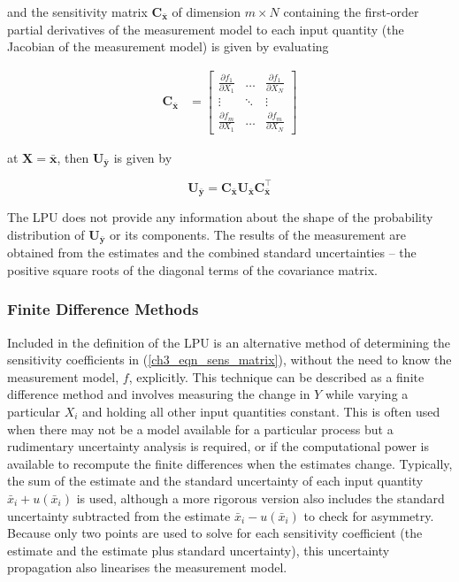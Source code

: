 \documentclass[../thesis/thesis.tex]{subfiles}
\begin{document}
and the sensitivity matrix $\boldsymbol C_{\bar{\boldsymbol x}}$ of dimension $m \times N$ containing the first-order partial derivatives of the measurement model to each input quantity (the Jacobian of the measurement model) is given by evaluating

\begin{align}
\boldsymbol C_{\bar{\boldsymbol x}} & = 
\begin{bmatrix}
\displaystyle \frac{\partial f_1}{\partial X_1}&\dots&\displaystyle \frac{\partial f_1}{\partial X_N}\\
\vdots&\ddots&\vdots\\
\displaystyle \frac{\partial f_m}{\partial X_1}&\dots&\displaystyle \frac{\partial f_m}{\partial X_N}
\end{bmatrix}
\label{ch3_eqn_sens_matrix}
\end{align}

at $\boldsymbol X = \bar{\boldsymbol x}$, then $\boldsymbol U_{\bar{\boldsymbol y}}$ is given by

\begin{equation}
\boldsymbol U_{\bar{\boldsymbol y}} = \boldsymbol C_{\bar{\boldsymbol x}}\boldsymbol U_{\bar{\boldsymbol x}}\boldsymbol C_{\bar{\boldsymbol x}}^\top
\end{equation}

The LPU does not provide any information about the shape of the probability distribution of $\boldsymbol U_{\bar{\boldsymbol y}}$ or its components. The results of the measurement are obtained from the estimates and the combined standard uncertainties – the positive square roots of the diagonal terms of the covariance matrix.

\subsubsection{Finite Difference Methods} \label{ch3_sec_fd_methods}

Included in the definition of the LPU is an alternative method of determining the sensitivity coefficients in (\ref{ch3_eqn_sens_matrix}), without the need to know the measurement model, $f$, explicitly. This technique can be described as a finite difference method and involves measuring the change in $Y$ while varying a particular $X_i$ and holding all other input quantities constant. This is often used when there may not be a model available for a particular process but a rudimentary uncertainty analysis is required, or if the computational power is available to recompute the finite differences when the estimates change. Typically, the sum of the estimate and the standard uncertainty of each input quantity $\bar{x}_i + u(\bar{x}_i)$ is used, although a more rigorous version also includes the standard uncertainty subtracted from the estimate $\bar{x}_i - u(\bar{x}_i)$ to check for asymmetry. Because only two points are used to solve for each sensitivity coefficient (the estimate and the estimate plus standard uncertainty), this uncertainty propagation also linearises the measurement model.
\end{document}
